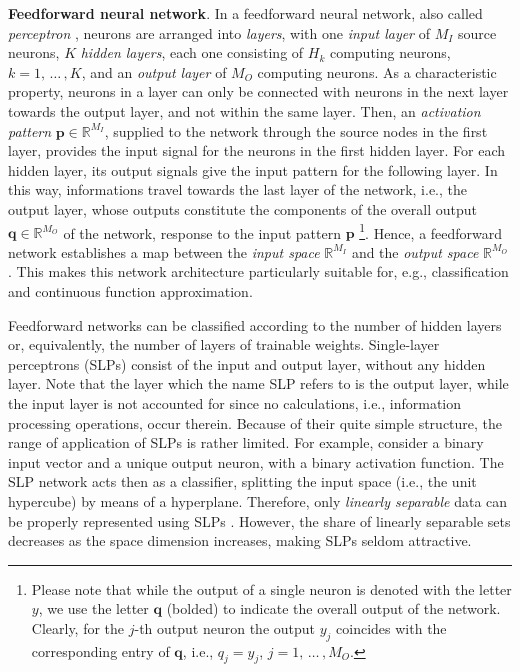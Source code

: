 \documentclass[12pt, a4paper, twoside, openright, notitlepage]{report}
\numberwithin{equation}{chapter}
\theoremstyle{theorem}
\theoremstyle{definition}
\theoremstyle{remark}
\theoremstyle{proposition}
\numberwithin{figure}{chapter}
\begin{document}
		\noindent \textbf{Feedforward neural network}. In a feedforward neural network, also called \emph{perceptron} \cite{Ros58}, neurons are arranged into \emph{layers}, with one \emph{input layer} of $M_I$ source neurons, $K$ \emph{hidden layers}, each one consisting of $H_k$ computing neurons, $k = 1, \, \ldots \, , K$, and an \emph{output layer} of $M_O$ computing neurons. As a characteristic property, neurons in a layer can only be connected with neurons in the next layer towards the output layer, and not within the same layer. Then, an \emph{activation pattern} $\mathbf{p} \in \mathbb{R}^{M_I}$, supplied to the network through the source nodes in the first layer, provides the input signal for the neurons in the first hidden layer. For each hidden layer, its output signals give the input pattern for the following layer. In this way, informations travel towards the last layer of the network, i.e., the output layer, whose outputs constitute the components of the overall output $\mathbf{q} \in \mathbb{R}^{M_O}$ of the network, response to the input pattern $\mathbf{p}$ \footnote{Please note that while the output of a single neuron is denoted with the letter $y$, we use the letter $\mathbf{q}$ (bolded) to indicate the overall output of the network. Clearly, for the $j$-th output neuron the output $y_j$ coincides with the corresponding entry of $\mathbf{q}$, i.e., $q_j = y_j$, $j = 1, \, \ldots \, , M_O$.}. Hence, a feedforward network establishes a map between the \emph{input space} $\mathbb{R}^{M_I}$ and the \emph{output space} $\mathbb{R}^{M_O}$. This makes this network architecture particularly suitable for, e.g., classification and continuous function approximation.
		
		Feedforward networks can be classified according to the number of hidden layers or, equivalently, the number of layers of trainable weights. Single-layer perceptrons (SLPs) consist of the input and output layer, without any hidden layer. Note that the layer which the name SLP refers to is the output layer, while the input layer is not accounted for since no calculations, i.e., information processing operations, occur therein. Because of their quite simple structure, the range of application of SLPs is rather limited. For example, consider a binary input vector and a unique output neuron, with a binary activation function. The SLP network acts then as a classifier, splitting the input space (i.e., the unit hypercube) by means of a hyperplane. Therefore, only \emph{linearly separable} data can be properly represented using SLPs \cite{Kri07}. However, the share of linearly separable sets decreases as the space dimension increases, making SLPs seldom attractive.
		
\end{document}
